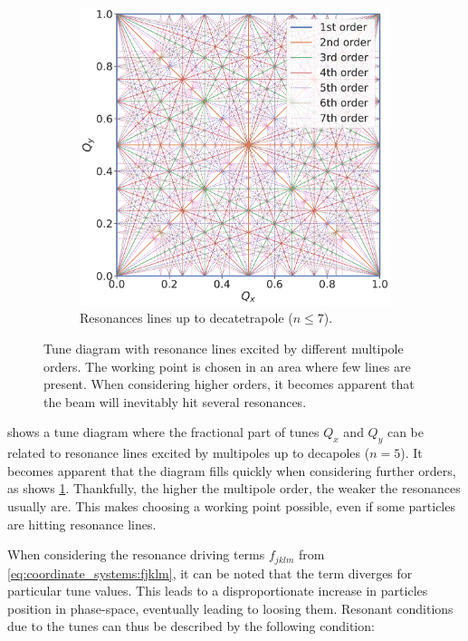 \begin{figure}[!htb]
\begin{subfigure}[b]{0.6\textwidth}
        \includegraphics[width=\textwidth]{images/resonance_diagram_n7.pdf}
        \caption{Resonances lines up to decatetrapole ($n \leq 7$).}
        \label{fig:resonances:diagram_n7}
    \end{subfigure}
    \caption{Tune diagram with resonance lines excited by different multipole orders. The working
    point is chosen in an area where few lines are present. When considering higher orders, it
    becomes apparent that the beam will inevitably hit several resonances.}
    \label{fig:resonances:diagrams}
\end{figure}

 shows a tune diagram where the fractional part of tunes $Q_x$ and
$Q_y$ can be related to resonance lines excited by multipoles up to decapoles ($n=5$).
It becomes apparent that the diagram fills quickly when considering further orders, as shows
\cref{fig:resonances:diagram_n7}.  Thankfully, the higher the multipole order, the weaker the
resonances usually are. This makes choosing a working point possible, even if some particles are
hitting resonance lines.



When considering the resonance driving terms $f_{jklm}$ from \cref{eq:coordinate_systems:fjklm}, it
can be noted that the term diverges for particular tune values. This leads to a disproportionate
increase in particles position in phase-space, eventually leading to loosing them.
Resonant conditions due to the tunes can thus be described by the following condition:

